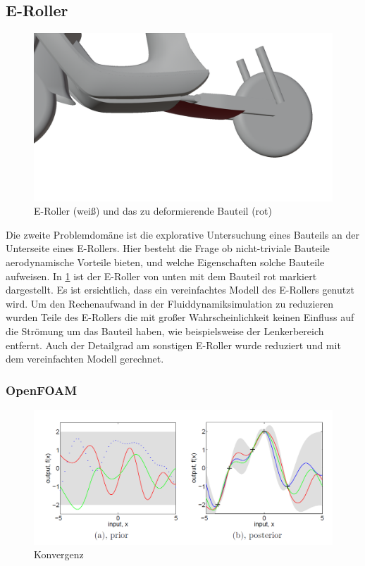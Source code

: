 \subsection{E-Roller}
\label{sub:method_escooter}
\begin{figure}[h]
	\centering
	\includegraphics[width=.8\linewidth]{bilder/escooter_component}
	\caption{E-Roller (weiß) und das zu deformierende Bauteil (rot)}
	\label{fig:escooter_component}
\end{figure}

Die zweite Problemdomäne ist die explorative Untersuchung eines Bauteils an der Unterseite eines E-Rollers.
Hier besteht die Frage ob nicht-triviale Bauteile aerodynamische Vorteile bieten, und welche Eigenschaften solche Bauteile aufweisen.
In \cref{fig:escooter_component} ist der E-Roller von unten mit dem Bauteil rot markiert dargestellt.
Es ist ersichtlich, dass ein vereinfachtes Modell des E-Rollers genutzt wird.
Um den Rechenaufwand in der Fluiddynamiksimulation zu reduzieren wurden Teile des E-Rollers die mit großer Wahrscheinlichkeit keinen Einfluss auf die Strömung um das Bauteil haben, wie beispielsweise der Lenkerbereich entfernt.
Auch der Detailgrad am sonstigen E-Roller wurde reduziert und mit dem vereinfachten Modell gerechnet.

\subsubsection{OpenFOAM}

\begin{figure}[h]
	\centering
	\includegraphics[width=.8\linewidth]{bilder/gp}
	\caption{Konvergenz}
	\label{fig:escooter_convergence}
\end{figure}

